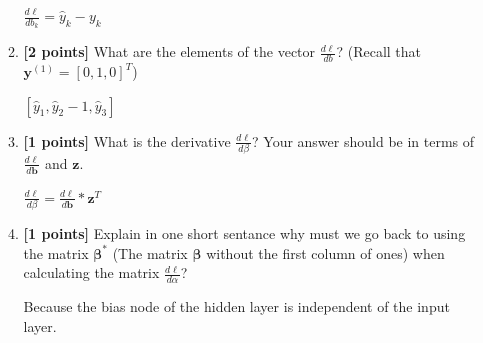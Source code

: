 \documentclass[11pt]{article}
\numberwithin{equation}{section} %
\numberwithin{figure}{section} %
\numberwithin{table}{section} %
\newcommand{\bv}{\mathbf{b}}
\newcommand{\yv}{\mathbf{y}}
\newcommand{\zv}{\mathbf{z}}
\newcommand{\betav      }{\boldsymbol \beta      }
\newcommand{\points}[1]{{\bf [#1 points]}}
\begin{document}
\begin{enumerate}
\begin{enumerate}
        
        \begin{tcolorbox}[fit,height=1cm, width=6cm, blank, borderline={1pt}{-2pt}]
            \begin{center}\huge$\frac{d\ell}{db_k} = \hat{y}_k - y_k$\end{center}
        \end{tcolorbox}
        
        
        
        \item \points{2} What are the elements of the vector $\frac{d\ell}{db}$? (Recall that  $\yv^{(1)}=[0,1,0]^T$)
        
        
        \begin{tcolorbox}[fit,height=1cm, width=6cm, blank, borderline={1pt}{-2pt}]
            \begin{center}\huge$[\hat{y}_1 , \hat{y}_2 - 1, \hat{y}_3]$\end{center}
        \end{tcolorbox}
        
        
        
        \item \points{1} What is the derivative $\frac{d\ell}{d\beta}$? Your answer should be in terms of $\frac{d\ell}{d\bv}$ and $\zv$.
        
        
        \begin{tcolorbox}[fit,height=3cm, width=6cm, blank, borderline={1pt}{-2pt}]
            \begin{center}\huge$\frac{d\ell}{d\beta} = \frac{d\ell}{d\bv}*\zv^T$\end{center}
        \end{tcolorbox}
        
        
        
        
        \item \points{1} Explain in one short sentance why must we go back to using the matrix $\betav^*$ (The matrix $\betav$ without the first column of ones) when calculating the matrix $\frac{d\ell}{d\alpha}$?
        
        
        \begin{tcolorbox}[fit,height=1cm, width=15cm, blank, borderline={1pt}{-2pt}]
            \begin{center}
            Because the bias node of the hidden layer is independent of the input layer.
            \end{center}
        \end{tcolorbox}
        

\end{enumerate}
\end{enumerate}
\end{document}
